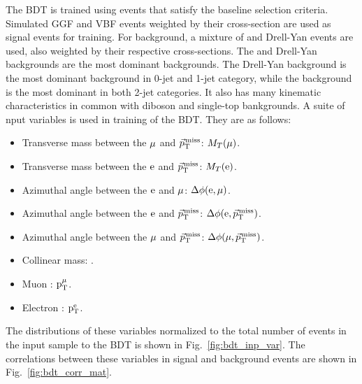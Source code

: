 The BDT is trained using events that satisfy the baseline selection criteria. Simulated GGF and VBF events weighted by their cross-section are used as signal events for training. For background, a mixture of \ttb and Drell-Yan events are used, also weighted by their respective cross-sections. The \ttb and Drell-Yan backgrounds are the most dominant backgrounds. The Drell-Yan background is the most dominant background in 0-jet and 1-jet category, while the \ttb background is the most dominant in both 2-jet categories. It also has many kinematic characteristics in common with diboson and single-top bankgrounds. A suite of nput variables is used in training of the BDT. They are as follows:
\begin{itemize}[itemsep=1pt]
\item Transverse mass between the $\mu$ and ${\vec p}_{\mathrm{T}}^{\kern1pt\text{miss}}$: $M_T(\mu)$.
\item Transverse mass between the $\text{e}$ and ${\vec p}_{\mathrm{T}}^{\kern1pt\text{miss}}$: $M_T(\text{e})$. 
\item Azimuthal angle between the $\text{e}$ and $\mu$: $\Delta\phi(\text{e}, \mu)$. 
\item Azimuthal angle between the $\text{e}$ and ${\vec p}_{\mathrm{T}}^{\kern1pt\text{miss}}$: $\Delta\phi(\text{e}, {\vec p}_{\mathrm{T}}^{\kern1pt\text{miss}})$.
\item Azimuthal angle between the $\mu$ and ${\vec p}_{\mathrm{T}}^{\kern1pt\text{miss}}$: $\Delta\phi(\mu, {\vec p}_{\mathrm{T}}^{\kern1pt\text{miss}})$. 
\item Collinear mass: \mcol.
\item Muon \pt: $\text{p}_\text{T}^{\mu}$. 
\item Electron \pt: $\text{p}_\text{T}^{\text{e}}$.
\end{itemize}
The distributions of these variables normalized to the total number of events in the input sample to the BDT is shown in Fig.~\ref{fig:bdt_inp_var}. The correlations between these variables in signal and background events are shown in Fig.~\ref{fig:bdt_corr_mat}.
